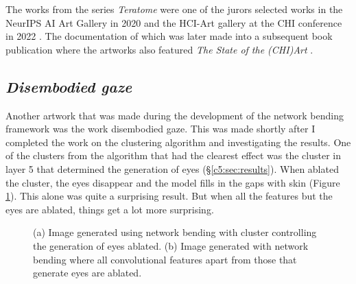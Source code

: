 The works from the series \textit{Teratome} were one of the jurors selected works in the NeurIPS AI Art Gallery in 2020 \citep{broad2020teratome} and the HCI-Art gallery at the CHI conference in 2022 \citep{perry2022art} . 
The documentation of which was later made into a subsequent book publication where the artworks also featured \textit{The State of the (CHI)Art} \citep{sturdee2023chiart}. 

\subsection{\textit{Disembodied gaze}}
\label{c7:subsubsec:disembodied}

Another artwork that was made during the development of the network bending framework was the work disembodied gaze. 
This was made shortly after I completed the work on the clustering algorithm and investigating the results. 
One of the clusters from the algorithm that had the clearest effect was the cluster in layer 5 that determined the generation of eyes (\S \ref{c5:sec:results}). 
When ablated the cluster, the eyes disappear and the model fills in the gaps with skin (Figure \ref{fig:c7:eyes-no-eyes}). 
This alone was quite a surprising result. But when all the features but the eyes are ablated, things get a lot more surprising. 

\begin{figure}[!htbp]
    \hfill
    \hfill
    \caption[Network bending eye cluster comparison]{(a) Image generated using network bending with cluster controlling the generation of eyes ablated. (b) Image generated with network bending where all convolutional features apart from those that generate eyes are ablated.}
    \label{fig:c7:eyes-no-eyes}
 \end{figure}

